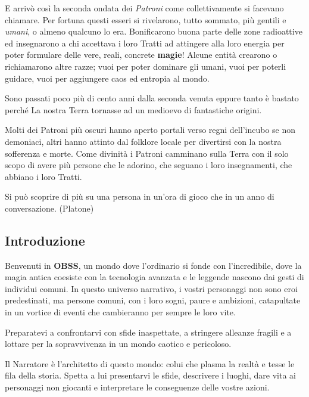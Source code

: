 \begin{multicols}{2}
E arrivò così la seconda ondata dei \emph{Patroni} come collettivamente si facevano chiamare. Per fortuna questi esseri si rivelarono, tutto sommato, più gentili e \emph{umani}, o almeno qualcuno lo era. Bonificarono buona parte delle zone radioattive ed insegnarono a chi accettava i loro Tratti ad attingere alla loro energia per poter formulare delle vere, reali, concrete \textbf{magie}!
Alcune entità crearono o richiamarono altre razze; vuoi per poter dominare gli umani, vuoi per poterli guidare, vuoi per aggiungere caos ed entropia al mondo.

Sono passati poco più di cento anni dalla seconda venuta eppure tanto è bastato perché La nostra Terra tornasse ad un medioevo di fantastiche origini.

Molti dei Patroni più oscuri hanno aperto portali verso regni dell'incubo se non demoniaci, altri hanno attinto dal folklore locale per divertirsi con la nostra sofferenza e morte. Come divinità i Patroni camminano sulla Terra con il solo scopo di avere più persone che le adorino, che seguano i loro insegnamenti, che abbiano i loro Tratti.

\medskip

\begin{enfasi}{Si può scoprire di più su una persona in un'ora di gioco che in un anno di conversazione. (Platone)}\end{enfasi}

\subsection{Introduzione}

Benvenuti in \textbf{OBSS}, un mondo dove l'ordinario si fonde con l'incredibile, dove la magia antica coesiste con la tecnologia avanzata e le leggende nascono dai gesti di individui comuni. In questo universo narrativo, i vostri personaggi non sono eroi predestinati, ma persone comuni, con i loro sogni, paure e ambizioni, catapultate in un vortice di eventi che cambieranno per sempre le loro vite.

Preparatevi a confrontarvi con sfide inaspettate, a stringere alleanze fragili e a lottare per la sopravvivenza in un mondo caotico e pericoloso.

Il Narratore è l’architetto di questo mondo: colui che plasma la realtà e tesse le fila della storia.
Spetta a lui presentarvi le sfide, descrivere i luoghi, dare vita ai personaggi non giocanti e interpretare le conseguenze delle vostre azioni.


\end{multicols}
